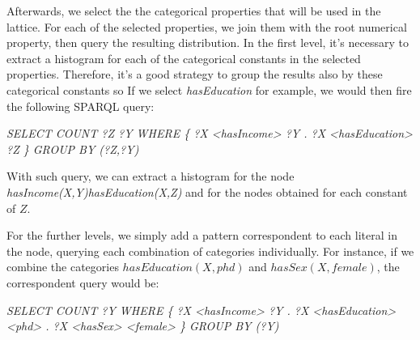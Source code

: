 Afterwards, we select the the categorical properties that will be used in the lattice. For each of the selected
properties, we join them with the root numerical property, then query the resulting distribution. In the first level,
it's necessary to extract a histogram for each of the categorical constants in the selected properties. Therefore, it's
a good strategy to group the results also by these categorical constants so If we select \emph{hasEducation} for
example, we would then fire the following SPARQL query:

\begin{center}
 \emph{SELECT COUNT ?Z ?Y WHERE \{ ?X <hasIncome> ?Y . ?X <hasEducation> ?Z \} GROUP BY (?Z,?Y)}
\end{center}

With such query, we can extract a histogram for the node \emph{hasIncome(X,Y)hasEducation(X,Z)} and for the
nodes obtained for each constant of $Z$. 

For the further levels, we simply add a pattern correspondent to each literal in the node, querying each combination of
categories individually. For instance, if we combine the categories $hasEducation(X,phd)$ and $hasSex(X,female)$, the
correspondent query would be:

\begin{center}
 \emph{SELECT COUNT ?Y WHERE \{ ?X <hasIncome> ?Y . ?X <hasEducation> <phd> . ?X <hasSex> <female> \} GROUP BY (?Y)}
\end{center}





% 



